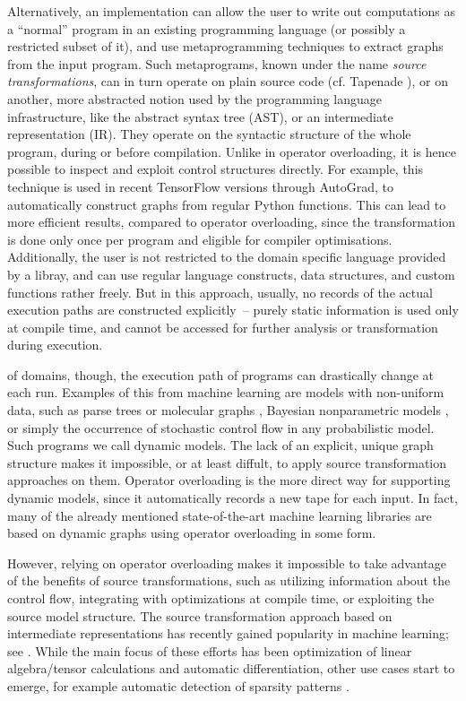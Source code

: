 Alternatively, an implementation can allow the user to write out computations as a \enquote{normal}
program in an existing programming language (or possibly a restricted subset of it), and use
metaprogramming techniques to extract graphs from the input program.  Such metaprograms, known under
the name \emph{source transformations}, can in turn operate on plain source code (cf. Tapenade
\parencite{tapenadedevelopers2019tapenade}), or on another, more abstracted notion used by the
programming language infrastructure, like the abstract syntax tree (AST), or an intermediate
representation (IR).  They operate on the syntactic structure of the whole program, during or before
compilation.  Unlike in operator overloading, it is hence possible to inspect and exploit control
structures directly.  For example, this technique is used in recent TensorFlow versions through
AutoGrad, to automatically construct graphs from regular Python functions.  This can lead to more
efficient results, compared to operator overloading, since the transformation is done only once per
program and eligible for compiler optimisations.  Additionally, the user is not restricted to the
domain specific language provided by a libray, and can use regular language constructs, data
structures, and custom functions rather freely.  But in this approach, usually, no records of the
actual execution paths are constructed explicitly~-- purely static information is used only at
compile time, and cannot be accessed for further analysis or transformation during execution.

 of domains, though, the execution path of programs can drastically change
at each run.  Examples of this from machine learning are models with non-uniform data, such as parse
trees \parencite{socher2011parsing} or molecular graphs \parencite{bianucci2000application},
Bayesian nonparametric models \parencite{hjort2010bayesian}, or simply the occurrence of stochastic
control flow in any probabilistic model.  Such programs we call dynamic models.  The lack of an
explicit, unique graph structure makes it impossible, or at least diffult, to apply source
transformation approaches on them.  Operator overloading is the more direct way for supporting
dynamic models, since it automatically records a new tape for each input. In fact, many of the
already mentioned state-of-the-art machine learning libraries are based on dynamic graphs using
operator overloading in some form.

However, relying on operator overloading makes it impossible to take advantage of the benefits of
source transformations, such as utilizing information about the control flow, integrating with
optimizations at compile time, or exploiting the source model structure.  The source transformation
approach based on intermediate representations has recently gained popularity in machine learning;
see \textcite{bradbury2018jax,lattner2020mlir}.  While the main focus of these efforts has been
optimization of linear algebra/tensor calculations and automatic differentiation, other use cases
start to emerge, for example automatic detection of sparsity patterns \parencite{gowda2019sparsity}.

